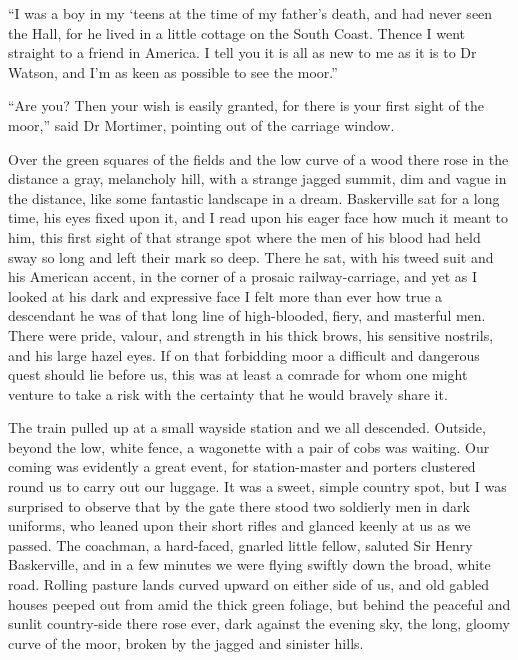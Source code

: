\documentclass[paper=a5,BCOR=7mm,twoside,DIV=calc,12pt,usegeometry,openany,chapterprefix,endperiod,headings=big]{scrbook} %
\begin{document}
\enquote{I was a boy in my `teens at the time of my father's death, and had never seen the Hall, for he lived in a little cottage on the South Coast. Thence I went straight to a friend in America. I tell you it is all as new to me as it is to Dr Watson, and I'm as keen as possible to see the moor.}

\enquote{Are you? Then your wish is easily granted, for there is your first sight of the moor,} said Dr Mortimer, pointing out of the carriage window.


Over the green squares of the fields and the low curve of a wood there rose in the distance a gray, melancholy hill, with a strange jagged summit, dim and vague in the distance, like some fantastic landscape in a dream. Baskerville sat for a long time, his eyes fixed upon it, and I read upon his eager face how much it meant to him, this first sight of that strange spot where the men of his blood had held sway so long and left their mark so deep. There he sat, with his tweed suit and his American accent, in the corner of a prosaic railway-carriage, and yet as I looked at his dark and expressive face I felt more than ever how true a descendant he was of that long line of high-blooded, fiery, and masterful men. There were pride, valour, and strength in his thick brows, his sensitive nostrils, and his large hazel eyes. If on that forbidding moor a difficult and dangerous quest should lie before us, this was at least a comrade for whom one might venture to take a risk with the certainty that he would bravely share it.

The train pulled up at a small wayside station and we all descended. Outside, beyond the low, white fence, a wagonette with a pair of cobs was waiting. Our coming was evidently a great event, for station-master and porters clustered round us to carry out our luggage. It was a sweet, simple country spot, but I was surprised to observe that by the gate there stood two soldierly men in dark uniforms, who leaned upon their short rifles and glanced keenly at us as we passed. The coachman, a hard-faced, gnarled little fellow, saluted Sir Henry Baskerville, and in a few minutes we were flying swiftly down the broad, white road. Rolling pasture lands curved upward on either side of us, and old gabled houses peeped out from amid the thick green foliage, but behind the peaceful and sunlit country-side there rose ever, dark against the evening sky, the long, gloomy curve of the moor, broken by the jagged and sinister hills.
\end{document}
